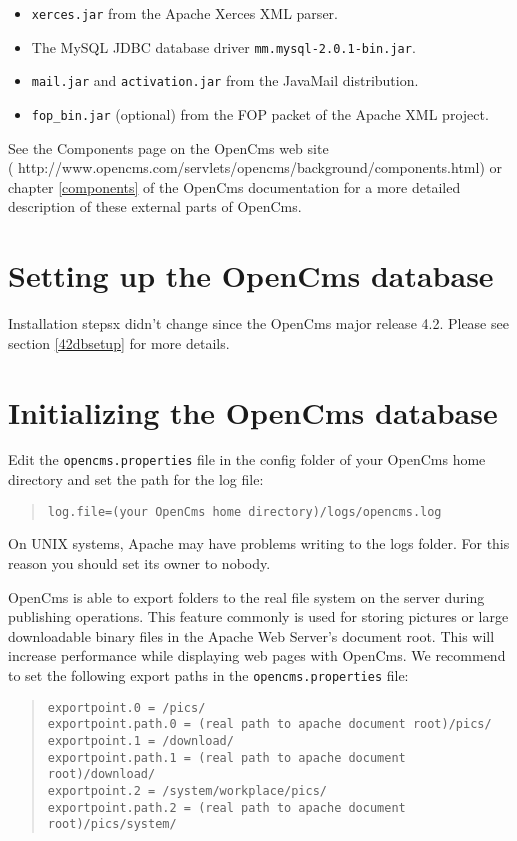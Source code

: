 \begin{itemize}
\item \texttt{xerces.jar} from the Apache Xerces XML parser. 
\item The MySQL JDBC database driver \texttt{mm.mysql-2.0.1-bin.jar}.
\item \texttt{mail.jar} and \texttt{activation.jar} from the JavaMail distribution.
\item \texttt{fop\_bin.jar} (optional) from the FOP packet of the Apache XML project.
\end{itemize}

See the Components page on the OpenCms web site\\
(
{http://www.opencms.com/servlets/opencms/background/components.html}) 
or chapter \ref{components} of the OpenCms documentation for a more detailed description
of these external parts of OpenCms.


\section{Setting up the OpenCms database}
Installation stepsx didn't change since the OpenCms major release 4.2. Please
see section \ref{42dbsetup} for more details.

\section{Initializing the OpenCms database}
Edit the \texttt{opencms.properties} file in the config folder of your OpenCms home 
directory and set the path for the log file:

\begin{quote}
\texttt{log.file=(your OpenCms home directory)/logs/opencms.log}
\end{quote}

On UNIX systems, Apache may have problems writing to the logs folder. 
For this reason you should set its owner to nobody. 

OpenCms is able to export folders to the real file system on the server during 
publishing operations. This feature commonly is used for storing pictures or large downloadable
binary files in the Apache Web Server's
document root. This will increase performance while displaying web pages with OpenCms.
We recommend to set the following export paths in the \texttt{opencms.properties} file:

\begin{quote}
\begin{verbatim}
exportpoint.0 = /pics/
exportpoint.path.0 = (real path to apache document root)/pics/
exportpoint.1 = /download/
exportpoint.path.1 = (real path to apache document root)/download/
exportpoint.2 = /system/workplace/pics/
exportpoint.path.2 = (real path to apache document root)/pics/system/
\end{verbatim}
\end{quote}

